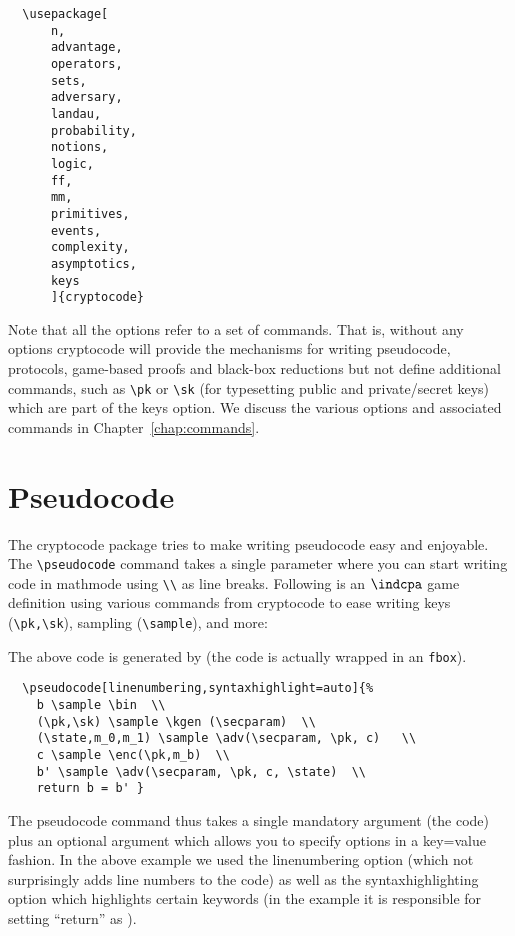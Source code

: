 \documentclass[a4paper]{report}
\begin{document}
  \begin{lstlisting}
  \usepackage[
	  n,
	  advantage,
	  operators,
	  sets,
	  adversary,
	  landau,
	  probability,
	  notions,
	  logic,
	  ff,
	  mm,
	  primitives,
	  events,
	  complexity,
	  asymptotics,
	  keys
	  ]{cryptocode}
  \end{lstlisting}
  
  Note that all the options refer to a set of commands. That is, without any options cryptocode will provide the mechanisms
  for writing pseudocode, protocols, game-based proofs and black-box reductions but not define additional commands,
  such as \lstinline$\pk$ or \lstinline$\sk$ (for typesetting public and private/secret keys) which are part of the keys option.
  We discuss the various options and associated commands in Chapter~\ref{chap:commands}.
  
  
  \section{Pseudocode}
  The cryptocode package tries to make writing pseudocode easy and enjoyable. The
  \lstinline$\pseudocode$ command takes a single parameter where you can start writing
  code in mathmode using \lstinline{\\} as line breaks. Following is an $\indcpa$ game
  definition using various commands from cryptocode to ease writing keys (\lstinline{\pk,\sk}),
  sampling (\lstinline{\sample}), and more:
  \begin{center}
  \end{center}
  
  
  The above code is generated by (the code is actually wrapped in an \lstinline$fbox$).
  \begin{lstlisting}
  \pseudocode[linenumbering,syntaxhighlight=auto]{%
	b \sample \bin  \\
	(\pk,\sk) \sample \kgen (\secparam)  \\
	(\state,m_0,m_1) \sample \adv(\secparam, \pk, c)   \\
	c \sample \enc(\pk,m_b)  \\
	b' \sample \adv(\secparam, \pk, c, \state)  \\
	return b = b' }
  \end{lstlisting}
  The pseudocode command thus takes a single mandatory argument (the code) plus an optional argument
  which allows you to specify options in a key=value fashion. In the above example we used the linenumbering
  option (which not surprisingly adds line numbers to the code) as well as the syntaxhighlighting option which
  highlights certain keywords (in the example it is responsible for setting \enquote{return} as ).
  
\end{document}
